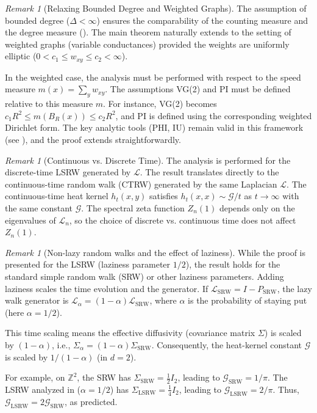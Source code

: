 \documentclass{article}
\numberwithin{equation}{section}
\theoremstyle{definition}
\theoremstyle{remark}
\newtheorem{remark}[theorem]{Remark}
\newcommand{\cG}{\mathcal{G}}
\newcommand{\LL}{\mathcal{L}}
\begin{document}
\begin{remark}[Relaxing Bounded Degree and Weighted Graphs]\label{rem:weighted}
The assumption of bounded degree ($\Delta < \infty$) ensures the comparability of the counting measure and the degree measure (). The main theorem naturally extends to the setting of weighted graphs (variable conductances) provided the weights are uniformly elliptic ($0 < c_1 \leq w_{xy} \leq c_2 < \infty$).

In the weighted case, the analysis must be performed with respect to the speed measure $m(x)=\sum_{y} w_{xy}$. The assumptions VG(2) and PI must be defined relative to this measure $m$. For instance, VG(2) becomes $c_1 R^2 \leq m(B_R(x)) \leq c_2 R^2$, and PI is defined using the corresponding weighted Dirichlet form. The key analytic tools (PHI, IU) remain valid in this framework (see \cite{Delmotte99}), and the proof extends straightforwardly.
\end{remark}


\begin{remark}[Continuous vs. Discrete Time]\label{rem:continuous_time}
The analysis is performed for the discrete-time LSRW generated by $\LL$. The result translates directly to the continuous-time random walk (CTRW) generated by the same Laplacian $\LL$. The continuous-time heat kernel $h_t(x,y)$ satisfies $h_t(x,x) \sim \cG/t$ as $t\to\infty$ with the same constant $\cG$. The spectral zeta function $Z_n(1)$ depends only on the eigenvalues of $\LL_n$, so the choice of discrete vs. continuous time does not affect $Z_n(1)$.
\end{remark}


\begin{remark}[Non-lazy random walks and the effect of laziness]\label{rem:non-lazy}
While the proof is presented for the LSRW (laziness parameter $1/2$), the result holds for the standard simple random walk (SRW) or other laziness parameters. Adding laziness scales the time evolution and the generator. If $\LL_{\text{SRW}} = I - P_{\text{SRW}}$, the lazy walk generator is $\LL_{\alpha} = (1-\alpha)\LL_{\text{SRW}}$, where $\alpha$ is the probability of staying put (here $\alpha=1/2$).

This time scaling means the effective diffusivity (covariance matrix $\Sigma$) is scaled by $(1-\alpha)$, i.e., $\Sigma_{\alpha} = (1-\alpha)\Sigma_{\text{SRW}}$. Consequently, the heat-kernel constant $\cG$ is scaled by $1/(1-\alpha)$ (in $d=2$).

For example, on $\mathbb{Z}^2$, the SRW has $\Sigma_{\text{SRW}} = \frac{1}{2} I_2$, leading to $\cG_{\text{SRW}} = 1/\pi$. The LSRW analyzed in  ($\alpha=1/2$) has $\Sigma_{\text{LSRW}} = \frac{1}{4} I_2$, leading to $\cG_{\text{LSRW}} = 2/\pi$. Thus, $\cG_{\text{LSRW}}=2\cG_{\text{SRW}}$, as predicted.
\end{remark}
\end{document}
